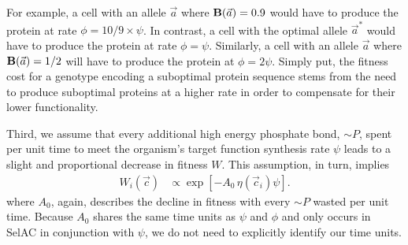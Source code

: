 \documentclass[12pt,letterpaper]{article}
\newcommand{\Func}{\ensuremath{\text{\textbf{B}}}\xspace}
\newcommand{\simP}{\ensuremath{\sim P}\xspace}
\newcommand{\selac}{SelAC\xspace}
\newcommand{\aoptvec}{\ensuremath{\Vec{a}^*}\xspace}
\newcommand{\avec}{\ensuremath{\Vec{a}}\xspace}
\newcommand{\cveci}{\ensuremath{\cvec_i}\xspace}
\newcommand{\cvec}{\ensuremath{\Vec{c}}\xspace}
\begin{document}
For example, a cell with an allele \avec where $\Func(\avec) = 0.9$ would have to produce the protein at rate $\phi = 10/9 \times \psi$.
In contrast, a cell with the optimal allele \aoptvec would have to produce the protein at rate $\phi = \psi$.
Similarly, a cell with an allele \avec where $\Func(\avec) = 1/2$ will have to produce the protein at $\phi = 2 \psi$.
Simply put, the fitness cost for a genotype encoding a suboptimal protein sequence stems from the need to produce suboptimal proteins at a higher rate in order to compensate for their lower functionality.


Third, we assume that every additional high energy phosphate bond, \simP, spent per unit time to meet the organism's target function synthesis rate $\psi$ leads to a slight and proportional decrease in fitness $W$.
This assumption, in turn, implies
\begin{align}
  W_i\left(\cvec\right) &\propto \exp\left[- A_0 \, \eta(\cveci) \psi\right].
\end{align}
where $A_0$, again, describes the decline in fitness with every \simP wasted per unit time.
Because $A_0$ shares the same time units as $\psi$ and $\phi$ and only occurs in \selac in conjunction with $\psi$, we do not need to explicitly identify our time units.
\end{document}
